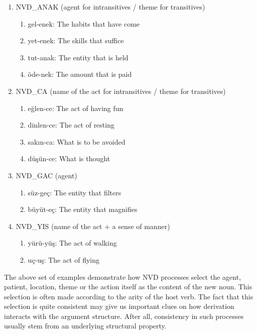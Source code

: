 \documentclass[11pt]{article} %
\begin{document}
\begin{enumerate}[resume*]
	\item NVD\_ANAK (agent for intransitives / theme for transitives)
	\begin{enumerate}[label=(\alph*), ref=(\alph*)]\itemsep1pt
	\item gel-enek: The habits that have come
	\item yet-enek: The skills that suffice
	\item tut-anak: The entity that is held
	\item öde-nek: The amount that is paid
	\end{enumerate}
	
	\item NVD\_CA (name of the act for intransitives / theme for transitives)
	\begin{enumerate}[label=(\alph*), ref=(\alph*)]\itemsep1pt
	\item eğlen-ce: The act of having fun
	\item dinlen-ce: The act of resting
	\item sakın-ca: What is to be avoided
	\item düşün-ce: What is thought
	\end{enumerate}
	
	\item NVD\_GAC (agent)
	\begin{enumerate}[label=(\alph*), ref=(\alph*)]\itemsep1pt
	\item süz-geç: The entity that filters
	\item büyüt-eç: The entity that magnifies
	\end{enumerate}
	
	\item NVD\_YIS (name of the act + a sense of manner)
	\begin{enumerate}[label=(\alph*), ref=(\alph*)]\itemsep1pt
	\item yürü-yüş: The act of walking
	\item uç-uş: The act of flying
	\end{enumerate}
\end{enumerate}

The above set of examples demonstrate how NVD processes select the agent, patient, location, theme or the action itself as the content of the new noun. This selection is often made according to the arity of the host verb. The fact that this selection is quite consistent may give us important clues on how derivation interacts with the argument structure. After all, consistency in such processes usually stem from an underlying structural property. 
\end{document}
